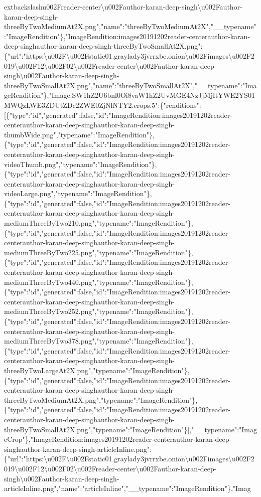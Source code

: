 extbackslash{}u002Freader-center\textbackslash{}u002Fauthor-karan-deep-singh\textbackslash{}u002Fauthor-karan-deep-singh-threeByTwoMediumAt2X.png","name":"threeByTwoMediumAt2X","\_\_typename":"ImageRendition"\},"ImageRendition:images20191202reader-centerauthor-karan-deep-singhauthor-karan-deep-singh-threeByTwoSmallAt2X.png":\{"url":"https:\textbackslash{}u002F\textbackslash{}u002Fstatic01.graylady3jvrrxbe.onion\textbackslash{}u002Fimages\textbackslash{}u002F2019\textbackslash{}u002F12\textbackslash{}u002F02\textbackslash{}u002Freader-center\textbackslash{}u002Fauthor-karan-deep-singh\textbackslash{}u002Fauthor-karan-deep-singh-threeByTwoSmallAt2X.png","name":"threeByTwoSmallAt2X","\_\_typename":"ImageRendition"\},"Image:SW1hZ2U6bnl0Oi8vaW1hZ2UvMGE4NzJjMjItYWE2YS01MWQzLWE3ZDUtZDc2ZWE0ZjNlNTY2.crops.5":\{"renditions":{[}\{"type":"id","generated":false,"id":"ImageRendition:images20191202reader-centerauthor-karan-deep-singhauthor-karan-deep-singh-thumbWide.png","typename":"ImageRendition"\},\{"type":"id","generated":false,"id":"ImageRendition:images20191202reader-centerauthor-karan-deep-singhauthor-karan-deep-singh-videoThumb.png","typename":"ImageRendition"\},\{"type":"id","generated":false,"id":"ImageRendition:images20191202reader-centerauthor-karan-deep-singhauthor-karan-deep-singh-videoLarge.png","typename":"ImageRendition"\},\{"type":"id","generated":false,"id":"ImageRendition:images20191202reader-centerauthor-karan-deep-singhauthor-karan-deep-singh-mediumThreeByTwo210.png","typename":"ImageRendition"\},\{"type":"id","generated":false,"id":"ImageRendition:images20191202reader-centerauthor-karan-deep-singhauthor-karan-deep-singh-mediumThreeByTwo225.png","typename":"ImageRendition"\},\{"type":"id","generated":false,"id":"ImageRendition:images20191202reader-centerauthor-karan-deep-singhauthor-karan-deep-singh-mediumThreeByTwo440.png","typename":"ImageRendition"\},\{"type":"id","generated":false,"id":"ImageRendition:images20191202reader-centerauthor-karan-deep-singhauthor-karan-deep-singh-mediumThreeByTwo252.png","typename":"ImageRendition"\},\{"type":"id","generated":false,"id":"ImageRendition:images20191202reader-centerauthor-karan-deep-singhauthor-karan-deep-singh-mediumThreeByTwo378.png","typename":"ImageRendition"\},\{"type":"id","generated":false,"id":"ImageRendition:images20191202reader-centerauthor-karan-deep-singhauthor-karan-deep-singh-threeByTwoLargeAt2X.png","typename":"ImageRendition"\},\{"type":"id","generated":false,"id":"ImageRendition:images20191202reader-centerauthor-karan-deep-singhauthor-karan-deep-singh-threeByTwoMediumAt2X.png","typename":"ImageRendition"\},\{"type":"id","generated":false,"id":"ImageRendition:images20191202reader-centerauthor-karan-deep-singhauthor-karan-deep-singh-threeByTwoSmallAt2X.png","typename":"ImageRendition"\}{]},"\_\_typename":"ImageCrop"\},"ImageRendition:images20191202reader-centerauthor-karan-deep-singhauthor-karan-deep-singh-articleInline.png":\{"url":"https:\textbackslash{}u002F\textbackslash{}u002Fstatic01.graylady3jvrrxbe.onion\textbackslash{}u002Fimages\textbackslash{}u002F2019\textbackslash{}u002F12\textbackslash{}u002F02\textbackslash{}u002Freader-center\textbackslash{}u002Fauthor-karan-deep-singh\textbackslash{}u002Fauthor-karan-deep-singh-articleInline.png","name":"articleInline","\_\_typename":"ImageRendition"\},"Imag